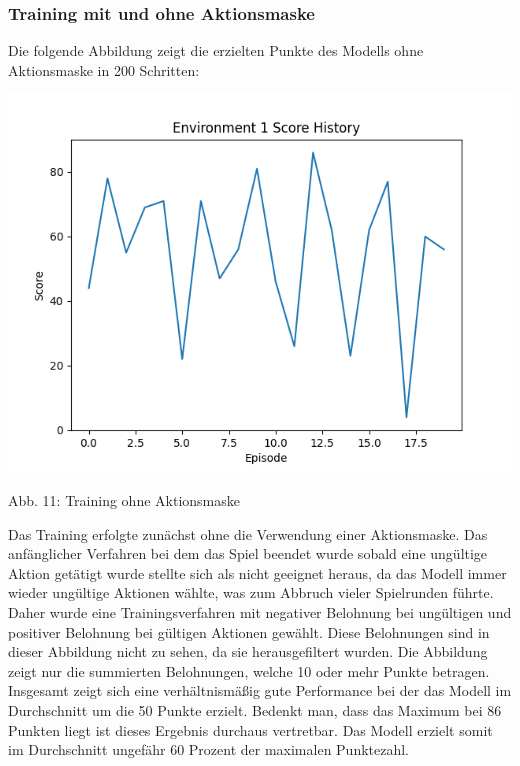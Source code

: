 \subsubsection{Training mit und ohne Aktionsmaske}
\begin{minipage}{\linewidth}
	Die folgende Abbildung zeigt die erzielten Punkte des Modells ohne Aktionsmaske in 200 Schritten:
	
	\vspace{0.5cm}
	\includegraphics[width=1\textwidth]{Bilder/trainingwithoutcancalation}
	
	Abb. 11: Training ohne Aktionsmaske\\
\end{minipage}

Das Training erfolgte zunächst ohne die Verwendung einer Aktionsmaske. Das anfänglicher Verfahren bei dem das Spiel beendet wurde sobald eine ungültige Aktion getätigt wurde stellte sich als nicht geeignet heraus, da das Modell immer wieder ungültige Aktionen wählte, was zum Abbruch vieler Spielrunden führte. Daher wurde eine Trainingsverfahren mit negativer Belohnung bei ungültigen und positiver Belohnung bei gültigen Aktionen gewählt. Diese Belohnungen sind in dieser Abbildung nicht zu sehen, da sie herausgefiltert wurden. Die Abbildung zeigt nur die summierten Belohnungen, welche 10 oder mehr Punkte betragen. Insgesamt zeigt sich eine verhältnismäßig gute Performance bei der das Modell im Durchschnitt um die 50 Punkte erzielt. Bedenkt man, dass das Maximum bei 86 Punkten liegt ist dieses Ergebnis durchaus vertretbar. Das Modell erzielt somit im Durchschnitt ungefähr 60 Prozent der maximalen Punktezahl.

